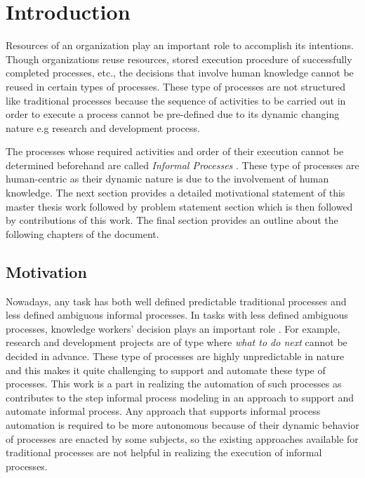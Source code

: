 \chapter{Introduction}
\label{chap:introduction}

Resources of an organization play an important role to accomplish its intentions. Though organizations reuse resources, stored execution procedure of successfully completed processes, etc., the decisions that involve human knowledge cannot be reused in certain types of processes. These type of processes are not structured like traditional processes because the sequence of activities to be carried out in order to execute a process cannot be pre-defined due to its dynamic changing nature e.g research and development process.

The processes whose required activities and order of their execution cannot be determined beforehand are called \textit{Informal Processes} \cite{Sungur2014}. These type of processes are human-centric as their dynamic nature is due to the involvement of human knowledge. The next section provides a detailed motivational statement of this master thesis work followed by problem statement section which is then followed by contributions of this work. The final section provides an outline about the following chapters of the document. 

\section{Motivation}
\label{sec:motivation}
Nowadays, any task has both well defined predictable traditional processes and less defined ambiguous informal processes. In tasks with less defined ambiguous processes, knowledge workers' decision plays an important role \cite{BPTrends2009}. For example, research and development projects are of type where \textit{what to do next} cannot be decided in advance. These type of processes are highly unpredictable in nature and this makes it quite challenging to support and automate these type of processes. This work is a part in realizing the automation of such processes as contributes to the step informal process modeling in an approach to support and automate informal process. Any approach that supports informal process automation is required to be more autonomous because of their dynamic behavior of processes are enacted by some subjects, so the existing approaches available for traditional processes are not helpful in realizing the execution of informal processes.  

